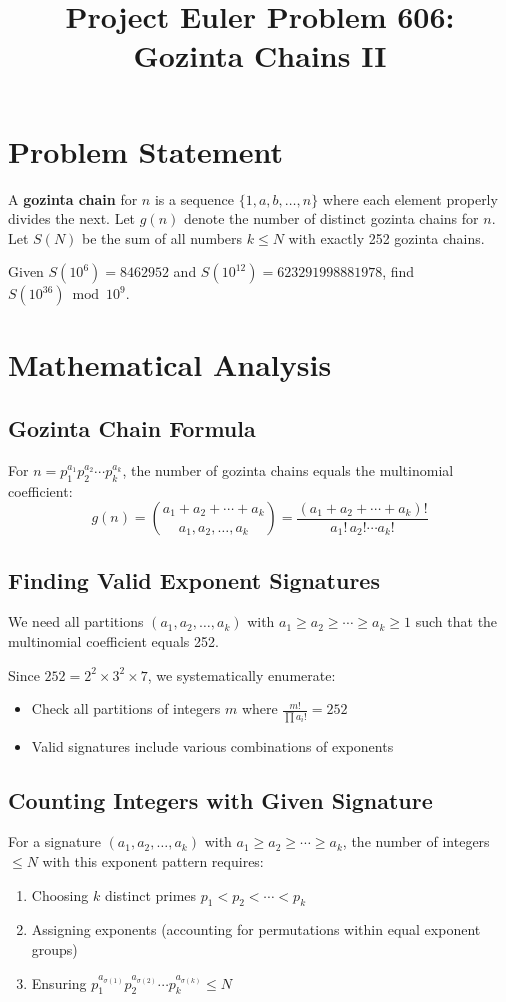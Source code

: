 \documentclass[12pt]{article}
\title{Project Euler Problem 606: Gozinta Chains II}
\author{}
\date{}
\begin{document}
\maketitle

\section{Problem Statement}
A \textbf{gozinta chain} for $n$ is a sequence $\{1, a, b, \ldots, n\}$ where each element properly divides the next. Let $g(n)$ denote the number of distinct gozinta chains for $n$. Let $S(N)$ be the sum of all numbers $k \leq N$ with exactly 252 gozinta chains.

Given $S(10^6) = 8462952$ and $S(10^{12}) = 623291998881978$, find $S(10^{36}) \bmod 10^9$.

\section{Mathematical Analysis}

\subsection{Gozinta Chain Formula}
For $n = p_1^{a_1} p_2^{a_2} \cdots p_k^{a_k}$, the number of gozinta chains equals the multinomial coefficient:
\[
g(n) = \binom{a_1 + a_2 + \cdots + a_k}{a_1, a_2, \ldots, a_k} = \frac{(a_1 + a_2 + \cdots + a_k)!}{a_1! \, a_2! \cdots a_k!}
\]

\subsection{Finding Valid Exponent Signatures}
We need all partitions $(a_1, a_2, \ldots, a_k)$ with $a_1 \geq a_2 \geq \cdots \geq a_k \geq 1$ such that the multinomial coefficient equals 252.

Since $252 = 2^2 \times 3^2 \times 7$, we systematically enumerate:
\begin{itemize}
\item Check all partitions of integers $m$ where $\frac{m!}{\prod a_i!} = 252$
\item Valid signatures include various combinations of exponents
\end{itemize}

\subsection{Counting Integers with Given Signature}
For a signature $(a_1, a_2, \ldots, a_k)$ with $a_1 \geq a_2 \geq \cdots \geq a_k$, the number of integers $\leq N$ with this exponent pattern requires:
\begin{enumerate}
\item Choosing $k$ distinct primes $p_1 < p_2 < \cdots < p_k$
\item Assigning exponents (accounting for permutations within equal exponent groups)
\item Ensuring $p_1^{a_{\sigma(1)}} p_2^{a_{\sigma(2)}} \cdots p_k^{a_{\sigma(k)}} \leq N$
\end{enumerate}
\end{document}

